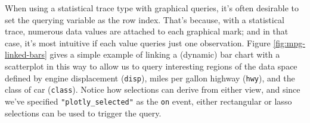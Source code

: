 \documentclass[
  12pt,
]{krantz}
\newenvironment{Shaded}{\begin{snugshade}}{\end{snugshade}}
\newcommand{\CommentTok}[1]{\textcolor[rgb]{0.56,0.35,0.01}{\textit{#1}}}
\newcommand{\DataTypeTok}[1]{\textcolor[rgb]{0.13,0.29,0.53}{#1}}
\newcommand{\KeywordTok}[1]{\textcolor[rgb]{0.13,0.29,0.53}{\textbf{#1}}}
\newcommand{\NormalTok}[1]{#1}
\newcommand{\OperatorTok}[1]{\textcolor[rgb]{0.81,0.36,0.00}{\textbf{#1}}}
\newcommand{\OtherTok}[1]{\textcolor[rgb]{0.56,0.35,0.01}{#1}}
\newcommand{\StringTok}[1]{\textcolor[rgb]{0.31,0.60,0.02}{#1}}
\begin{document}
When using a statistical trace type with graphical queries, it's often desirable to set the querying variable as the row index. That's because, with a statistical trace, numerous data values are attached to each graphical mark; and in that case, it's most intuitive if each value queries just one observation. Figure \ref{fig:mpg-linked-bars} gives a simple example of linking a (dynamic) bar chart with a scatterplot in this way to allow us to query interesting regions of the data space defined by engine displacement (\texttt{disp}), miles per gallon highway (\texttt{hwy}), and the class of car (\texttt{class}). Notice how selections can derive from either view, and since we've specified \texttt{"plotly\_selected"} as the \texttt{on} event, either rectangular or lasso selections can be used to trigger the query.


\begin{Shaded}
\end{Shaded}
\end{document}
